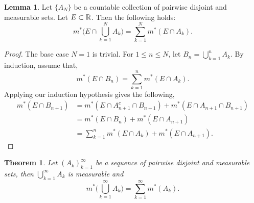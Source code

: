 \documentclass{article}
\newtheorem{theorem}{Theorem}
\theoremstyle{axiom} \newtheorem{axiom}{Axiom}
\theoremstyle{definition} \newtheorem{definition}{Definition}
\theoremstyle{example} \newtheorem{example}{Example}
\theoremstyle{proposition} \newtheorem{prop}{Proposition}
\theoremstyle{lemma} \newtheorem{lemma}{Lemma}
\begin{document}
\begin{lemma} \label{lemma:ctlbadd}
	Let $\{A_N\}$ be a countable collection of pairwise disjoint and measurable 
	sets. Let $E \subset \mathbb{R}$. Then the following holds:
	\begin{equation}
		m^*\bigg( E\cap \bigcup_{k=1}^N  A_k \bigg) = \sum_{k=1}^N m^*(E\cap A_k).
	\end{equation}
\end{lemma}
\begin{proof}
	The base case $N=1$ is trivial.
	For $1\leq n \leq N$, let $B_n = \bigcup_{k=1}^n A_k$. By induction,
	assume that,
	\begin{equation*}
		m^*(E \cap B_n) = \sum_{k=1}^n m^*(E\cap A_k).
	\end{equation*}
	Applying our induction hypothesis gives the following,
	\begin{equation*}
		\begin{split}
		m^*(E\cap B_{n+1}) &= m^*(E\cap A^c_{n+1} \cap B_{n+1}) + m^*(E\cap A_{n+1} \cap B_{n+1})  \\
			&= m^*(E\cap B_{n}) + m^*(E \cap A_{n+1}) \\
			&= \sum_{k=1}^n m^*(E\cap A_{k}) + m^*(E \cap A_{n+1}). 
		\end{split}
	\end{equation*}
\end{proof}
\begin{theorem} \label{thm:union}
	Let $(A_k)^{\infty}_{k=1}$ be a sequence of pairwise disjoint and 
	measurable sets, then $\bigcup^{\infty}_{k=1}A_k$ is measurable and
	\begin{equation}
		m^*\bigg(\bigcup^{\infty}_{k=1} A_k \bigg) = \sum^{\infty}_{k=1} m^*(A_k).
	\end{equation}
\end{theorem}
\end{document}
